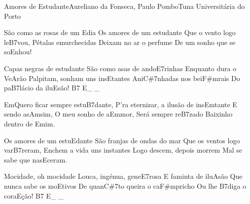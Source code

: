 \begin{musica}{Amores de Estudante}{Aureliano da Fonseca, Paulo Pombo}{Tuna Universitária do Porto}

São como as rosas de um \ac{E}{dia}
Os amores de um estudante
Que o vento logo le\ac{B7}{vou},
Pétalas emurchecidas
Deixam no ar o perfume
De um sonho que se so\ac{E}{nhou}!

Capas negras de estudante
São como asas de ando\ac{E7}{ri}nhas
Enquanto dura o Ve\ac{A}{rão}
Palpitam, sonham uns ins\ac{E}{tan}tes
Ani\ac{C#7}{nha}das nos bei\ac{F#m}{rais}
Do pa\ac{B7}{lá}cio da ilu\ac{E}{são}! \ac{B7 E}{}_ _

\ac{Em}{Que}ro ficar sempre estu\ac{B7}{dan}te,
P’ra eternizar, a ilusão de ins\ac{Em}{tan}te
E sendo as\ac{Am}{sim},
O meu sonho de a\ac{Em}{mor},
Será sempre re\ac{B7}{za}do
Baixinho dentro de \ac{E}{mim}.

Os amores de um estu\ac{E}{dan}te
São franjas de ondas do mar
Que os ventos logo var\ac{B7}{re}ram,
Enchem a vida uns instantes
Logo descem, depois morrem
Mal se sabe que nas\ac{E}{ce}ram.

Mocidade, oh mocidade
Louca, ingénua, gene\ac{E7}{ro}sa
E faminta de ilu\ac{A}{são}
Que nunca sabe os mo\ac{E}{ti}vos
De quan\ac{C#7}{to} queira o ca\ac{F#m}{pri}cho
Ou lhe \ac{B7}{di}ga o cora\ac{E}{ção}! \ac{B7 E}{}_ _


\end{musica}
